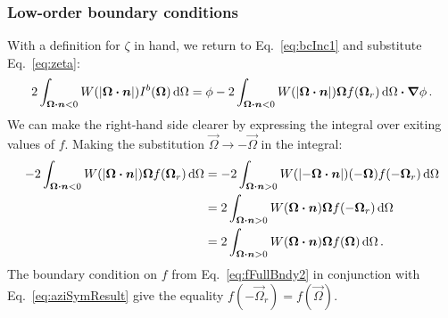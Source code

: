 \subsubsection{Low-order boundary conditions}
With a definition for $\zeta$ in hand, we return to Eq.~\eqref{eq:bcInc1} and
substitute Eq.~\eqref{eq:zeta}:
\begin{equation*}
  2\int_{\bm{\Omega}\bm{\cdot} \bm{n} < 0}
  W(\left| \bm{\Omega} \bm{\cdot} \bm{n} \right|) I^b(\bm{\Omega}) \mathop{}\!\mathrm{d}\Omega
  = \phi
  - 2\int_{\bm{\Omega}\bm{\cdot} \bm{n} < 0} W(\left| \bm{\Omega} \bm{\cdot} \bm{n} \right|)
  \bm{\Omega} f(\bm{\Omega}_r) \mathop{}\!\mathrm{d}\Omega
  \bm{\cdot} \bm{\nabla} \phi \,.
\end{equation*}
We can make the right-hand side clearer by expressing the integral over exiting
values of $f$. Making the substitution $\vec{\Omega}\to-\vec{\Omega}$ in the
integral:
\begin{align*}
  - 2\int_{\bm{\Omega}\bm{\cdot} \bm{n} < 0} W(\left| \bm{\Omega} \bm{\cdot} \bm{n} \right|)
  \bm{\Omega} f(\bm{\Omega}_r) \mathop{}\!\mathrm{d}\Omega
  &= 
  - 2\int_{\bm{\Omega}\bm{\cdot} \bm{n} > 0} W(\left| -\bm{\Omega} \bm{\cdot} \bm{n} \right|)
  ( - \bm{\Omega}) f(-\bm{\Omega}_r) \mathop{}\!\mathrm{d}\Omega
  \\
  &= 
  2\int_{\bm{\Omega}\bm{\cdot} \bm{n} > 0} W(\bm{\Omega} \bm{\cdot} \bm{n})
  \bm{\Omega} f(-\bm{\Omega}_r) \mathop{}\!\mathrm{d}\Omega
  \\ 
  &= 
  2\int_{\bm{\Omega}\bm{\cdot} \bm{n} > 0} W(\bm{\Omega} \bm{\cdot} \bm{n})
  \bm{\Omega} f(\bm{\Omega}) \mathop{}\!\mathrm{d}\Omega \,.
\end{align*}
The boundary condition on $f$ from Eq.~\eqref{eq:fFullBndy2} in conjunction
with Eq.~\eqref{eq:aziSymResult} give the equality $f(-\vec{\Omega}_r) =
f(\vec{\Omega})$.

